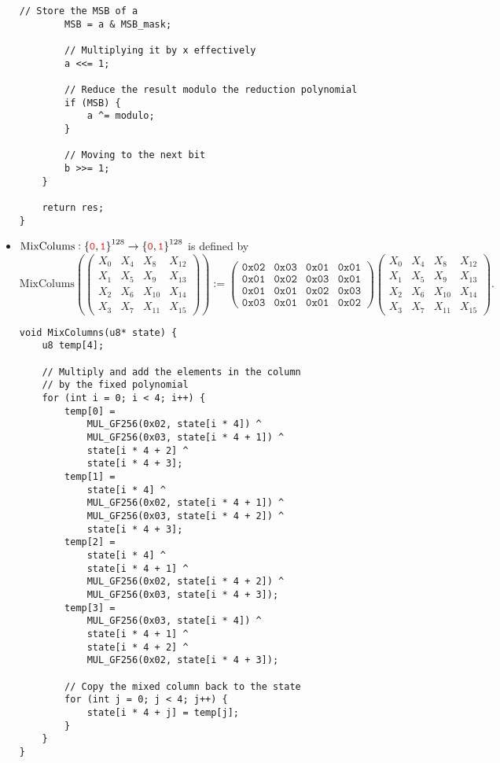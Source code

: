 \begin{itemize}
\begin{lstlisting}[style=C, caption={Multiplication in GF($2^8$)},captionpos=t]
		// Store the MSB of a
		MSB = a & MSB_mask;
		
		// Multiplying it by x effectively
		a <<= 1;
		
		// Reduce the result modulo the reduction polynomial
		if (MSB) {
			a ^= modulo;
		}
		
		// Moving to the next bit
		b >>= 1;
	}
	
	return res;
}
	\end{lstlisting}
	\newpage
	\item $\text{MixColums}:\set{\textcolor{red}{\texttt{0}},\textcolor{red}{\texttt{1}}}^{128}\to\set{\textcolor{red}{\texttt{0}},\textcolor{red}{\texttt{1}}}^{128}$ is defined by \[
	\text{MixColums}\left(\begin{pmatrix}
		X_0 & X_4 & X_8 & X_{12} \\
		X_1 & X_5 & X_9 & X_{13} \\
		X_2 & X_6 & X_{10} & X_{14} \\
		X_3 & X_7 & X_{11} & X_{15}
	\end{pmatrix}\right):=\begin{pmatrix}
		\texttt{0x02} & \texttt{0x03} & \texttt{0x01} & \texttt{0x01}\\
		\texttt{0x01} & \texttt{0x02} & \texttt{0x03} & \texttt{0x01}\\
		\texttt{0x01} & \texttt{0x01} & \texttt{0x02} & \texttt{0x03}\\
		\texttt{0x03} & \texttt{0x01} & \texttt{0x01} & \texttt{0x02}
	\end{pmatrix}\begin{pmatrix}
		X_0 & X_4 & X_8 & X_{12} \\
		X_1 & X_5 & X_9 & X_{13} \\
		X_2 & X_6 & X_{10} & X_{14} \\
		X_3 & X_7 & X_{11} & X_{15}
		\end{pmatrix}.
	\]
	\begin{lstlisting}[style=C, caption={MixColums},captionpos=t]
void MixColumns(u8* state) {
	u8 temp[4];
	
	// Multiply and add the elements in the column
	// by the fixed polynomial
	for (int i = 0; i < 4; i++) { 
		temp[0] =
			MUL_GF256(0x02, state[i * 4]) ^
			MUL_GF256(0x03, state[i * 4 + 1]) ^
			state[i * 4 + 2] ^
			state[i * 4 + 3]; 
		temp[1] =
			state[i * 4] ^
			MUL_GF256(0x02, state[i * 4 + 1]) ^
			MUL_GF256(0x03, state[i * 4 + 2]) ^
			state[i * 4 + 3];
		temp[2] =
			state[i * 4] ^
			state[i * 4 + 1] ^
			MUL_GF256(0x02, state[i * 4 + 2]) ^
			MUL_GF256(0x03, state[i * 4 + 3]);
		temp[3] =
			MUL_GF256(0x03, state[i * 4]) ^
			state[i * 4 + 1] ^
			state[i * 4 + 2] ^
			MUL_GF256(0x02, state[i * 4 + 3]);
		
		// Copy the mixed column back to the state
		for (int j = 0; j < 4; j++) {
			state[i * 4 + j] = temp[j];
		}
	}
}
	\end{lstlisting}
\end{itemize}


